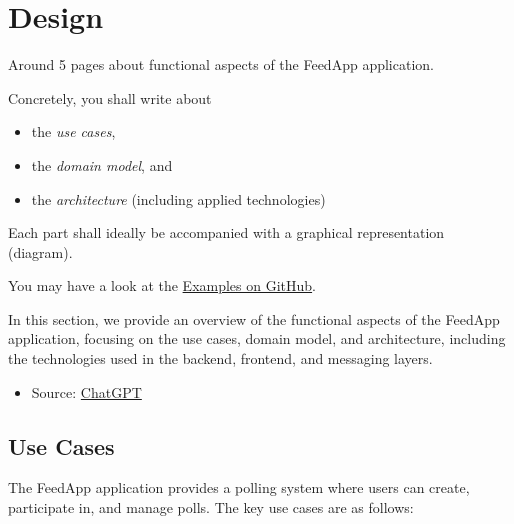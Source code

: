 \section{Design}
\label{sec:design}

Around 5 pages about functional aspects of the FeedApp application.

Concretely, you shall write about 

\begin{itemize}
	\item the \emph{use cases},
	\item the \emph{domain model}, and
	\item the \emph{architecture} (including applied technologies)
\end{itemize}

Each part shall ideally be accompanied with a graphical representation (diagram).

You may have a look at the \href{https://github.com/selabhvl/dat250public/blob/master/projectdescription/README.md}{Examples on GitHub}.

In this section, we provide an overview of the functional aspects of the FeedApp application, focusing on the use cases, domain model, and architecture, including the technologies used in the backend, frontend, and messaging layers.


\begin{itemize}
    \item Source: \href{https://chatgpt.com/share/672fbc4f-ecf4-8007-b147-6759b1884b9c}{ChatGPT}
\end{itemize}

\subsection{Use Cases}
The FeedApp application provides a polling system where users can create, participate in, and manage polls. The key use cases are as follows:

